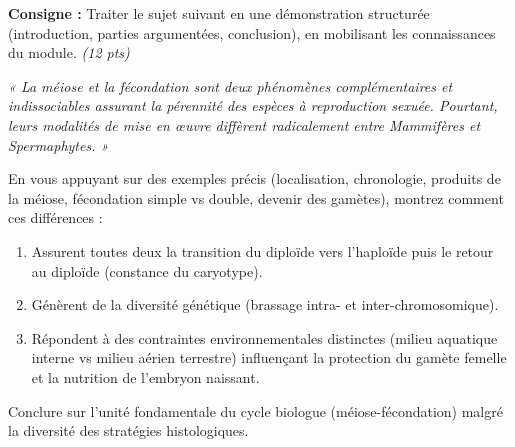 \documentclass[11pt]{article}
\begin{document}
\begin{exercice}
\textbf{Consigne :} Traiter le sujet suivant en une démonstration structurée (introduction, parties argumentées, conclusion), en mobilisant les connaissances du module. \textit{(12 pts)}

\textit{« La méiose et la fécondation sont deux phénomènes complémentaires et indissociables assurant la pérennité des espèces à reproduction sexuée. Pourtant, leurs modalités de mise en œuvre diffèrent radicalement entre Mammifères et Spermaphytes. »}

En vous appuyant sur des exemples précis (localisation, chronologie, produits de la méiose, fécondation simple vs double, devenir des gamètes), montrez comment ces différences :
\begin{enumerate}
    \item Assurent toutes deux la transition du diploïde vers l'haploïde puis le retour au diploïde (constance du caryotype).
    \item Génèrent de la diversité génétique (brassage intra- et inter-chromosomique).
    \item Répondent à des contraintes environnementales distinctes (milieu aquatique interne vs milieu aérien terrestre) influençant la protection du gamète femelle et la nutrition de l'embryon naissant.
\end{enumerate}
Conclure sur l'unité fondamentale du cycle biologue (méiose-fécondation) malgré la diversité des stratégies histologiques.
\end{exercice}
\end{document}
